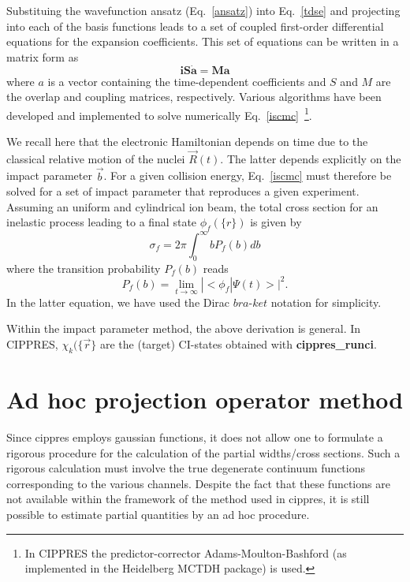 \documentclass[a4paper, 10 pt]{report}
\begin{document}
Substituing the wavefunction ansatz (Eq.~\ref{ansatz}) into Eq.~\ref{tdse} and projecting into each of the basis functions leads to a set of coupled first-order differential equations for the expansion coefficients. This set of equations can be written in a matrix form as
\begin{equation}
\textbf{iS}\dot{\textbf{a}} = \textbf{Ma} 
\label{iscmc}
\end{equation}
where $a$ is a vector containing the time-dependent coefficients and $S$ and $M$ are the overlap and coupling matrices, respectively. Various algorithms have been developed and implemented to solve numerically Eq.~\ref{iscmc}~\footnote{In CIPPRES the predictor-corrector Adams-Moulton-Bashford (as implemented in the Heidelberg MCTDH package) is used.}.

We recall here that the electronic Hamiltonian depends on time due to the classical relative motion of the nuclei $\vec{R}(t)$. The latter depends explicitly on the impact parameter $\vec{b}$. For a given collision energy, Eq.~\ref{iscmc} must therefore be solved for a set of impact parameter that reproduces a given experiment. Assuming an uniform and cylindrical ion beam, the total cross section for an inelastic process leading to a final state $\phi_f(\{r\})$ is given by
\begin{equation}
\sigma_{f} = 2\pi \int_0^{\infty} b P_f(b) db
\label{tcs}
\end{equation}
where the transition probability $P_f(b)$ reads
\begin{equation}
P_f(b) = \lim_{t\rightarrow \infty} |<\phi_f| \Psi(t)>|^2.
\label{pb}
\end{equation}
In the latter equation, we have used the Dirac $bra$-$ket$ notation for simplicity.

Within the impact parameter method, the above derivation is general. In CIPPRES, $ \chi_k(\{\vec{r}\}$ are the (target) CI-states obtained with {\bf cippres\_runci}.

\section{Ad hoc projection operator method}

Since cippres employs gaussian functions, it does not allow one to formulate a rigorous procedure for the calculation of the partial widths/cross sections. Such a rigorous
calculation must involve the true degenerate continuum functions corresponding to the various channels. Despite the fact that these functions are not available within the framework of the method used in cippres, it is still possible to estimate partial quantities by an ad hoc procedure.
\end{document}
